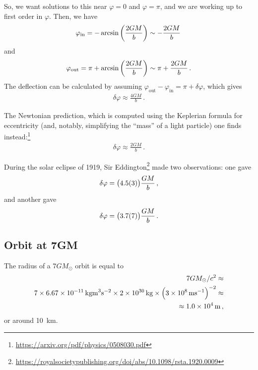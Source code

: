 \documentclass[main.tex]{subfiles}
\begin{document}
So, we want solutions to this near \(\varphi = 0\) and \(\varphi = \pi \), and we are working up to first order in \(\varphi \). Then, we have 
%
\begin{align}
  \varphi _{\text{in}} = - \arcsin \qty(\frac{2GM}{b}) 
  \sim - \frac{2GM}{b}
\,
\end{align}
%
and  
%
\begin{align}
  \varphi _{\text{out}}  = \pi + \arcsin \qty( \frac{2GM}{b}) \sim \pi + \frac{2GM}{b}
\,.
\end{align}
%
The deflection can be calculated by assuming \( \varphi _{\text{out}} - \varphi _{\text{in}} = \pi + \delta \varphi \), which gives 
%
\begin{align}
  \delta \varphi \approx \frac{4GM}{b}
\,.
\end{align}
%

The Newtonian prediction, which is computed using the Keplerian formula for eccentricity (and, notably, simplifying the ``mass'' of a light particle) one finds instead:\footnote{\url{https://arxiv.org/pdf/physics/0508030.pdf}}
%
\begin{align}
  \delta \varphi \approx \frac{2GM}{b}
\,.
\end{align}

During the solar eclipse of 1919, Sir Eddington\footnote{\url{https://royalsocietypublishing.org/doi/abs/10.1098/rsta.1920.0009}} made two observations: one gave 
%
\begin{align}
  \delta \varphi = \qty(\SI{4.5(3)}{}) \frac{GM}{b}
\,,
\end{align}
%
and another gave 
%
\begin{align}
  \delta \varphi = \qty(\SI{3.7(7)}{}) \frac{GM}{b}
\,.
\end{align}
%

\subsection{Orbit at 7GM}

The radius of a \(7G M_{\odot}\) orbit is equal to 
%
\begin{align}
  7GM_{\odot}/c^2 \approx\\
  7 \times \SI{6.67e-11}{kg m^{3} s^{-2}} \times \SI{2e30}{kg} \times \qty(\SI{3e8}{ms^{-1}})^{-2} \approx \\
  \approx \SI{1.0e4}{m}
\,,
\end{align}
%
or around \SI{10}{km}. 
\end{document}
